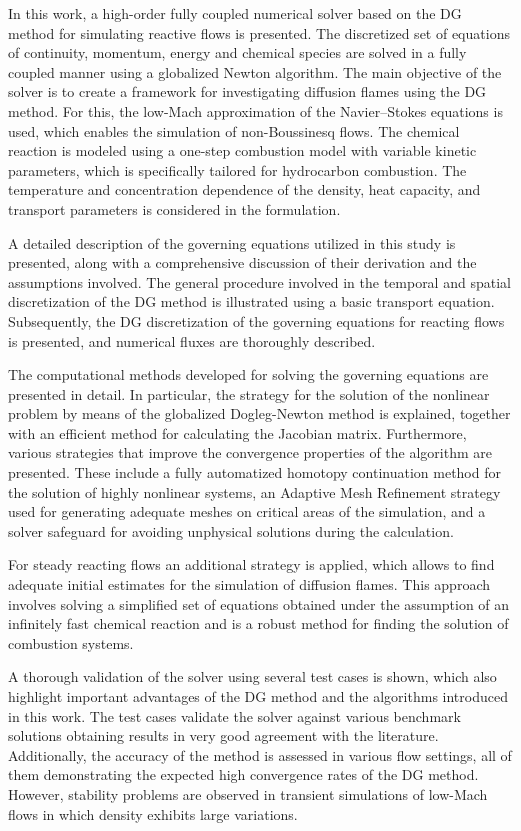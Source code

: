 \glsresetall
In this work, a high-order fully coupled numerical solver based on the \Gls{DG} method for simulating reactive flows is presented. The discretized set of equations of continuity, momentum, energy and chemical species are solved in a fully coupled manner using a globalized Newton algorithm. The main objective of the solver is to create a framework for investigating diffusion flames using the \Gls{DG} method. For this, the low-Mach approximation of the Navier--Stokes equations is used, which enables the simulation of non-Boussinesq flows. The chemical reaction is modeled using a one-step combustion model with variable kinetic parameters, which is specifically tailored for hydrocarbon combustion. The temperature and concentration dependence of the density, heat capacity, and transport parameters is considered in the formulation. 

A detailed description of the governing equations utilized in this study is presented, along with a comprehensive discussion of their derivation and the assumptions involved.
The general procedure involved in the temporal and spatial discretization of the \Gls{DG} method is illustrated using a basic transport equation. Subsequently, the DG discretization of the governing equations for reacting flows is presented, and numerical fluxes are thoroughly described. 

The computational methods developed for solving the governing equations are presented in detail. In particular, the strategy for the solution of the nonlinear problem by means of the globalized Dogleg-Newton method is explained, together with an efficient method for calculating the Jacobian matrix. Furthermore, various strategies that improve the convergence properties of the algorithm are presented. These include a fully automatized homotopy continuation method for the solution of highly nonlinear systems, an Adaptive Mesh Refinement strategy used for generating adequate meshes on critical areas of the simulation, and a solver safeguard for avoiding unphysical solutions during the calculation. 

For steady reacting flows an additional strategy is applied, which allows to find adequate initial estimates for the simulation of diffusion flames. This approach involves solving a simplified set of equations obtained under the assumption of an infinitely fast chemical reaction and is a robust method for finding the solution of combustion systems.

A thorough validation of the solver using several test cases is shown, which also highlight important advantages of the DG method and the algorithms introduced in this work. The test cases validate the solver against various benchmark solutions obtaining results in very good agreement with the literature. Additionally, the accuracy of the method is assessed in various flow settings, all of them demonstrating the expected high convergence rates of the \Gls{DG} method. However, stability problems are observed in transient simulations of low-Mach flows in which density exhibits large variations.